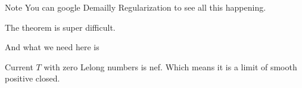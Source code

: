 \begin{thing6}{Note}\leavevmode
You can google Demailly Regularization to see all this happening.
\end{thing6}

\begin{remark}\leavevmode
The theorem is super difficult.
\end{remark}

And what we need here is

\begin{coro}\leavevmode
Current \(T\) with zero Lelong numbers is nef. Which means it is a limit of smooth positive closed.
\end{coro}










%

